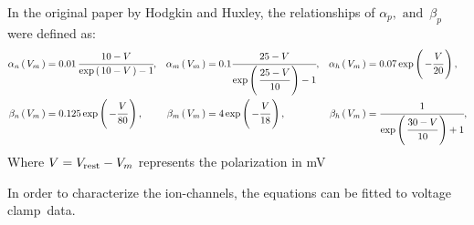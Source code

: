 \documentclass[../../Orator.tex]{subfiles}
\begin{document}
In the original paper by Hodgkin and Huxley, the relationships of \(\alpha_p, \text{ and }\, \beta_p\) were defined as:
\begin{align*}
    \alpha_n \left(\,V_m\,\right) &= 0.01 \, \cfrac{ 10 - V }{ \mathrm{exp}\left(\, 10 - V \,\right) - 1}, &
    \alpha_m \left(\,V_m\,\right) &= 0.1 \cfrac{ 25 - V }{\mathrm{exp}\left(\,\cfrac{25-V}{10}\,\right) - 1}, &
    \alpha_h \left(\,V_m\,\right) &=  0.07 \, \mathrm{exp}\left(\,-\cfrac{V}{20}\,\right), \\
    \beta_n \left(\,V_m\,\right)  &= 0.125 \, \mathrm{exp}\left(\,-\cfrac{V}{80}\,\right), &
    \beta_m \left(\,V_m\,\right)  &= 4 \, \mathrm{exp}\left(\,-\cfrac{V}{18}\,\right), &
    \beta_h \left(\,V_m\,\right)  &= { \cfrac{1}{\mathrm{exp}\left(\,\cfrac{30 - V}{10}\,\right) + 1}},
\end{align*}
Where \(V = V_{\mathrm{rest}} - V_m\) represents the polarization in \unit{\milli\volt}

In order to characterize the ion-channels, the equations can be fitted to voltage clamp\footnotemark~data.


\begin{comment}
    Breaking down the equation we find the following regions:
    \begin{equation*}
        I = 
        \overbrace{C_m \ode{V_m}{t}}^{\mathclap{\text{rate of change of voltage scaled by capacitance}}} + 
        \bar{g}_\rmm{K} n^4 \br{V_m - V_\rmm{K}} + 
        \bar{g}_\rmm{Na} m^3 h \br{V_m - V_\rmm{Na}}  + 
        \bar{g}_\rmm{L} \br{V_m - V_\rmm{L}} 
    \end{equation*}




    \begin{figure}[h]
        \centering
        \begin{tikzpicture}
            
            \draw (0,0) circle (0.25);
            
        \end{tikzpicture}
        \caption{fart}\label{<label>}
    \end{figure}
\end{comment}
\end{document}
